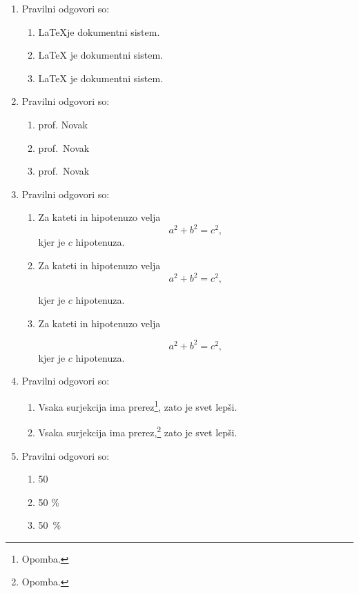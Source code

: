 \documentclass[11pt]{article}
\begin{document}
\begin{enumerate}
    \item Pravilni odgovori so: %
    \begin{enumerate}
        \item \LaTeX je dokumentni sistem.
        \item {\LaTeX} je dokumentni sistem.
        \item \LaTeX{} je dokumentni sistem.
    \end{enumerate}

    \item Pravilni odgovori so: %
    \begin{enumerate}
        \item prof. Novak
        \item prof.~Novak
        \item prof.\ Novak
    \end{enumerate}

    \item Pravilni odgovori so: %
    \begin{enumerate}
        \item
Za kateti in hipotenuzo velja
\[
  a^2 + b^2 = c^2,
\]
kjer je \(c\) hipotenuza.
        \item
Za kateti in hipotenuzo velja
\[
  a^2 + b^2 = c^2,
\]

kjer je \(c\) hipotenuza.
        \item
Za kateti in hipotenuzo velja

\[
  a^2 + b^2 = c^2,
\]
kjer je \(c\) hipotenuza.
    \end{enumerate}

    \item Pravilni odgovori so: %
    \begin{enumerate}
        \item Vsaka surjekcija ima prerez\footnote{Opomba.}, zato je svet lepši.
        \item Vsaka surjekcija ima prerez,\footnote{Opomba.} zato je svet lepši.
    \end{enumerate}

    \item Pravilni odgovori so: %
    \begin{enumerate}
        \item 50 %
        \item 50 \%
        \item 50~\%
    \end{enumerate}


\end{enumerate}
\end{document}
